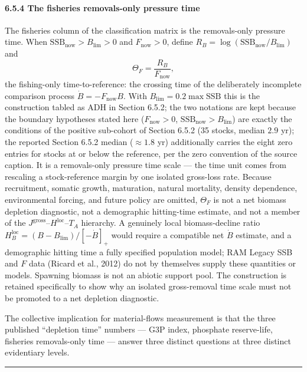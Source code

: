 \documentclass[11pt]{article}
\begin{document}
\paragraph{6.5.4 The fisheries removals-only pressure
time}\label{the-fisheries-removals-only-pressure-time}

The fisheries column of the classification matrix is the removals-only
pressure time. When \(\mathrm{SSB}_{\mathrm{now}} > B_{\lim} > 0\) and
\(F_{\mathrm{now}} > 0\), define
\(R_B = \log(\mathrm{SSB}_{\mathrm{now}}/B_{\lim})\) and
\[\Theta_F = \frac{R_B}{F_{\mathrm{now}}},\] the fishing-only
time-to-reference: the crossing time of the deliberately incomplete
comparison process \(\dot B = -F_{\mathrm{now}}B\). With
\(B_{\lim} = 0.2 \max \mathrm{SSB}\) this is the construction tabled as
ADH in Section 6.5.2; the two notations are kept because the boundary
hypotheses stated here (\(F_{\mathrm{now}} > 0\),
\(\mathrm{SSB}_{\mathrm{now}} > B_{\lim}\)) are exactly the conditions
of the positive sub-cohort of Section 6.5.2 (35 stocks, median \(2.9\)
yr); the reported Section 6.5.2 median (\(\approx 1.8\) yr) additionally
carries the eight zero entries for stocks at or below the reference, per
the zero convention of the source caption. It is a removals-only
pressure time scale --- the time unit comes from rescaling a
stock-reference margin by one isolated gross-loss rate. Because
recruitment, somatic growth, maturation, natural mortality, density
dependence, environmental forcing, and future policy are omitted,
\(\Theta_F\) is not a net biomass depletion diagnostic, not a
demographic hitting-time estimate, and not a member of the
\(J^{\mathrm{gross}}\)--\(H^{\mathrm{loc}}\)--\(T_A\) hierarchy. A
genuinely local biomass-decline ratio
\(H_B^{\mathrm{loc}} = (B - B_{\lim})/[-\dot B]_+\) would require a
compatible net \(\dot B\) estimate, and a demographic hitting time a
fully specified population model; RAM Legacy SSB and \(F\) data (Ricard
et al., 2012) do not by themselves supply these quantities or models.
Spawning biomass is not an abiotic support pool. The construction is
retained specifically to show why an isolated gross-removal time scale
must not be promoted to a net depletion diagnostic.

The collective implication for material-flows measurement is that the
three published ``depletion time'' numbers --- G3P index, phosphate
reserve-life, fisheries removals-only time --- answer three distinct
questions at three distinct evidentiary levels.

\begin{center}\rule{0.5\linewidth}{0.5pt}\end{center}
\end{document}
